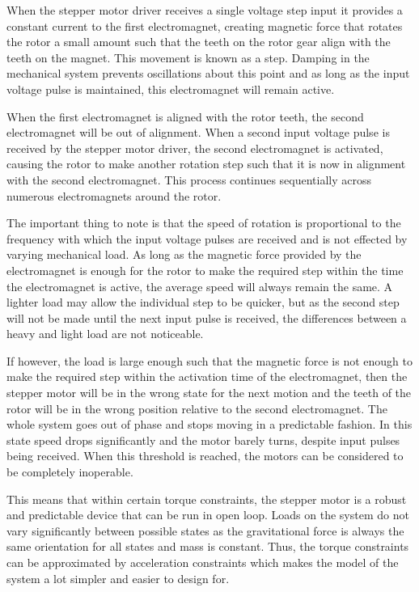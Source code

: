 		When the stepper motor driver receives a single voltage step input it provides a constant current to the first electromagnet, creating magnetic force that rotates the rotor a small amount such that the teeth on the rotor gear align with the teeth on the magnet. This movement is known as a step. Damping in the mechanical system prevents oscillations about this point and as long as the input voltage pulse is maintained, this electromagnet will remain active.
		
		When the first electromagnet is aligned with the rotor teeth, the second electromagnet will be out of alignment. When a second input voltage pulse is received by the stepper motor driver, the second electromagnet is activated, causing the rotor to make another rotation step such that it is now in alignment with the second electromagnet. This process continues sequentially across numerous electromagnets around the rotor.
		
		The important thing to note is that the speed of rotation is proportional to the frequency with which the input voltage pulses are received and is not effected by varying mechanical load. As long as the magnetic force provided by the electromagnet is enough for the rotor to make the required step within the time the electromagnet is active, the average speed will always remain the same. A lighter load may allow the individual step to be quicker, but as the second step will not be made until the next input pulse is received, the differences between a heavy and light load are not noticeable.
		
		If however, the load is large enough such that the magnetic force is not enough to make the required step within the activation time of the electromagnet, then the stepper motor will be in the wrong state for the next motion and the teeth of the rotor will be in the wrong position relative to the second electromagnet. The whole system goes out of phase and stops moving in a predictable fashion. In this state speed drops significantly and the motor barely turns, despite input pulses being received. When this threshold is reached, the motors can be considered to be completely inoperable.
		
		This means that within certain torque constraints, the stepper motor is a robust and predictable device that can be run in open loop. Loads on the system do not vary significantly between possible states as the gravitational force is always the same orientation for all states and mass is constant. Thus, the torque constraints can be approximated by acceleration constraints which makes the model of the system a lot simpler and easier to design for.